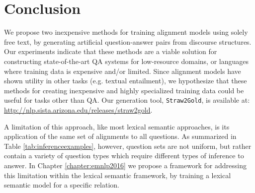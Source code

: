 







\section{Conclusion}
\label{sec-naacl2015:conclusion}

We propose two inexpensive methods for training alignment models using solely free text, by generating artificial question-answer pairs from discourse structures. 
Our experiments indicate that these methods are a viable solution for constructing state-of-the-art QA systems for low-resource domains, or languages where training data is expensive and/or limited.  Since alignment models have shown utility in other tasks (e.g. textual entailment), we hypothesize that these methods for creating inexpensive and highly specialized training data could be useful for tasks other than QA.  
Our generation tool, {\tt Straw2Gold}, is available at: {\small \url{http://nlp.sista.arizona.edu/releases/straw2gold}}.

A limitation of this approach, like most lexical semantic approaches, is its application of the same set of alignments to all questions.  As summarized in Table \ref{tab:inferenceexamples}, however, question sets are not uniform, but rather contain a variety of question types which require different types of inference to answer.  In Chapter \ref{chapter:emnlp2016} we propose a framework for addressing this limitation within the lexical semantic framework, by training a lexical semantic model for a specific relation. 


